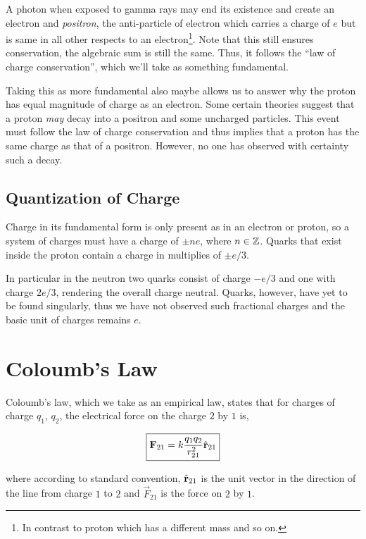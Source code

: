 A photon when exposed to gamma rays may end its existence and create an electron 
and \emph{positron}, the anti-particle of electron which carries a charge of \(e\) but 
is same in all other respects to an electron\footnote{In contrast to proton 
which has a different mass and so on.}. Note that this still ensures conservation,
the algebraic sum is still the same. Thus, it follows the ``law of charge 
conservation'', which we'll take as something fundamental.

Taking this as more fundamental also maybe allows us to answer 
why the proton has equal magnitude of charge as an electron. Some 
certain theories suggest that a proton \emph{may} decay into a positron
and some uncharged particles. This event must follow the law of charge 
conservation and thus implies that a proton has the same charge as that of 
a positron.
However, no one has observed with certainty such a decay.

\subsection{Quantization of Charge}

Charge in its fundamental form is only present as in an electron or proton, 
so a system of charges must have a charge of \(\pm ne\), where \(n \in \mathbb Z\).
Quarks that exist inside the proton contain a charge in multiplies of \(\pm e/3\).

In particular in the neutron two quarks consist of charge \(-e/3\) and one with 
charge \(2e/3\), rendering the overall charge neutral. 
Quarks, however, have yet to be found singularly, thus we have not observed such fractional charges
and the basic unit of charges remains \(e\). 

\section{Coloumb's Law}

Coloumb's law, which we take as an empirical law, states that 
for charges of charge \(q_1\), \(q_2\), the electrical force 
on the charge \(2\) by \(1\) is,

\begin{equation}
    \label{coloumb force}
    \boxed{\boldsymbol{\mathbf{F}}_{21} = k\frac{q_1q_2}{r_{21}^2}\hat{\boldsymbol{\mathbf{r}}}_{21}}
\end{equation}

where according to standard convention, \(\hat{\boldsymbol{\mathbf{r}}}_{21}\) is the unit vector 
in the direction of the line from charge \(1\) to \(2\) and \(\vec{F}_{21}\) is 
the force on \(2\) by \(1\).

